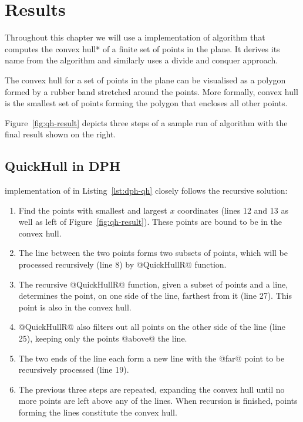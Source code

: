 \documentclass[preamble.tex]{subfiles}
\begin{document}
\clearpage

\chapter{Results}
\label{ch:Results}
\label{sec:QuickHull}

Throughout this chapter we will use a  implementation of \QuickHull algorithm \cite{QuickHull} that computes the \*convex hull* of a finite set of points in the plane. It derives its name from the  algorithm and similarly uses a divide and conquer approach.

The convex hull for a set of points in the plane can be visualised as a polygon formed by a rubber band stretched around the points. More formally, convex hull is the smallest set of points forming the polygon that encloses all other points.

Figure~\ref{fig:qh-result} depicts three steps of a sample run of \QuickHull algorithm with the final result shown on the right.


\section{QuickHull in DPH}

 implementation of \QuickHull in Listing~\ref{lst:dph-qh} closely follows the recursive solution:
\begin{enumerate}
  \item Find the points with smallest and largest $x$ coordinates (lines 12 and 13 as well as left of Figure~\ref{fig:qh-result}). These points are bound to be in the convex hull.

  \item The line between the two points forms two subsets of points, which will be processed recursively (line 8) by @QuickHullR@ function.

  \item The recursive @QuickHullR@ function, given a subset of points and a line, determines the point, on one side of the line, farthest from it (line 27). This point is also in the convex hull.

  \item @QuickHullR@ also filters out all points on the other side of the line (line 25), keeping only the points @above@ the line.

  \item The two ends of the line each form a new line with the @far@ point to be recursively processed (line 19).

  \item The previous three steps are repeated, expanding the convex hull until no more points are left above any of the lines. When recursion is finished, points forming the lines constitute the convex hull.
\end{enumerate}
\end{document}
